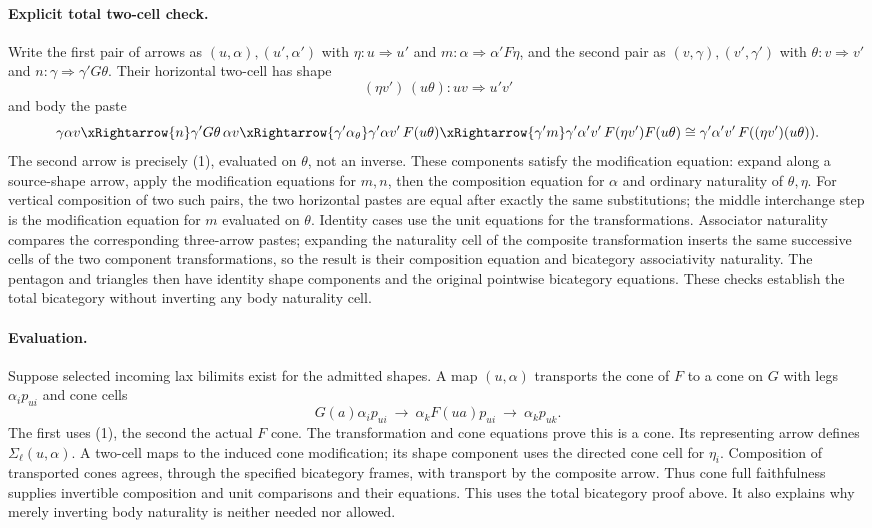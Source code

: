\documentclass{article}
\begin{document}
\paragraph{Explicit total two-cell check.} Write the first pair of arrows as $(u,\alpha),(u',\alpha')$ with $\eta:u\Rightarrow u'$ and $m:\alpha\Rightarrow\alpha'F\eta$, and the second pair as $(v,\gamma),(v',\gamma')$ with $\theta:v\Rightarrow v'$ and $n:\gamma\Rightarrow\gamma'G\theta$. Their horizontal two-cell has shape
\[
 (\eta v')\,(u\theta):uv\Rightarrow u'v'
\]
and body the paste
\[
 \gamma\alpha v\xRightarrow{n}\gamma'G\theta\,\alpha v
 \xRightarrow{\gamma'\alpha_\theta}\gamma'\alpha v'\,F(u\theta)
 \xRightarrow{\gamma'm}\gamma'\alpha'v'\,F(\eta v')F(u\theta)
 \cong\gamma'\alpha'v'\,F((\eta v')(u\theta)).
\]
The second arrow is precisely (1), evaluated on $\theta$, not an inverse. These components satisfy the modification equation: expand along a source-shape arrow, apply the modification equations for $m,n$, then the composition equation for $\alpha$ and ordinary naturality of $\theta,\eta$. For vertical composition of two such pairs, the two horizontal pastes are equal after exactly the same substitutions; the middle interchange step is the modification equation for $m$ evaluated on $\theta$. Identity cases use the unit equations for the transformations. Associator naturality compares the corresponding three-arrow pastes; expanding the naturality cell of the composite transformation inserts the same successive cells of the two component transformations, so the result is their composition equation and bicategory associativity naturality. The pentagon and triangles then have identity shape components and the original pointwise bicategory equations. These checks establish the total bicategory without inverting any body naturality cell.

\paragraph{Evaluation.} Suppose selected incoming lax bilimits exist for the admitted shapes. A map $(u,\alpha)$ transports the cone of $F$ to a cone on $G$ with legs $\alpha_i p_{u i}$ and cone cells
\[
 G(a)\alpha_i p_{u i}\ \longrightarrow\
 \alpha_kF(ua)p_{u i}\ \longrightarrow\ \alpha_kp_{u k}.
\tag{2}
\]
The first uses (1), the second the actual $F$ cone. The transformation and cone equations prove this is a cone. Its representing arrow defines $\Sigma_\ell(u,\alpha)$. A two-cell maps to the induced cone modification; its shape component uses the directed cone cell for $\eta_i$. Composition of transported cones agrees, through the specified bicategory frames, with transport by the composite arrow. Thus cone full faithfulness supplies invertible composition and unit comparisons and their equations. This uses the total bicategory proof above. It also explains why merely inverting body naturality is neither needed nor allowed.
\end{document}
